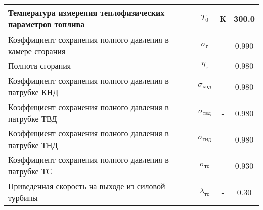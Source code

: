 \begin{center}
\begin{longtable}{|p{7cm}|c|c|c|}
		Температура измерения теплофизических параметров топлива & $T_0$ & К & 300.0 \\ \hline
		Коэффициент сохранения полного давления в камере сгорания & $\sigma_{г}$ & - & 0.990 \\ \hline
		Полнота сгорания & $\eta_{г}$ & - & 0.980 \\ \hline
		Коэффициент сохранения полного давления в патрубке КНД & $\sigma_{кнд}$ & - & 0.980 \\ \hline
		Коэффициент сохранения полного давления в патрубке ТВД & $\sigma_{твд}$ & - & 0.980 \\ \hline
		Коэффициент сохранения полного давления в патрубке ТНД & $\sigma_{тнд}$ & - & 0.980 \\ \hline
		Коэффициент сохранения полного давления в патрубке ТС & $\sigma_{тс}$ & - & 0.930 \\ \hline
		Приведенная скорость на выходе из силовой турбины & $\lambda_{тс}$ & - & 0.30 \\ \hline
	\end{longtable}
\end{center}

%